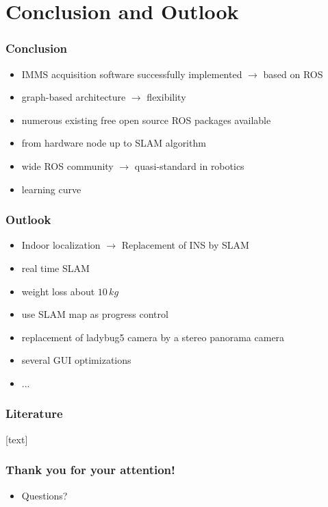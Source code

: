 \documentclass[aspectratio=169]{beamer}
\begin{document}
\section{Conclusion and Outlook}

\begin{frame}
 \frametitle{Conclusion}
 \begin{itemize}
  \item IMMS acquisition software successfully implemented $\rightarrow$ based on ROS
  \item graph-based architecture $\rightarrow$ flexibility \pause
  \item numerous existing free open source ROS packages available
  \item from hardware node up to SLAM algorithm \pause
  \item wide ROS community $\rightarrow$ quasi-standard in robotics \pause
  \item learning curve
 \end{itemize}

\end{frame}

\begin{frame}
 \frametitle{Outlook}
 \begin{itemize}
  \item Indoor localization $\rightarrow$ Replacement of INS by SLAM
  \item real time SLAM
  \item weight loss about $10\,kg$
  \item use SLAM map as progress control
  \item replacement of ladybug5 camera by a stereo panorama camera
  \item several GUI optimizations
  \item ...
 \end{itemize}

\end{frame}

\begin{frame}
%
\frametitle{Literature}
\small{}[text]


\end{frame}

\begin{frame}
 \frametitle{Thank you for your attention!}
 \begin{itemize}
  \item Questions?
 \end{itemize}
\end{frame}
\end{document}
